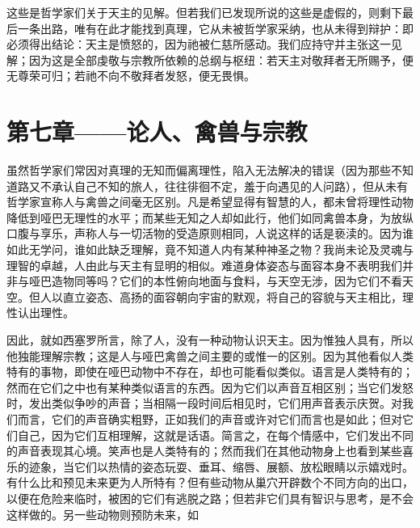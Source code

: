 这些是哲学家们关于天主的见解。但若我们已发现所说的这些是虚假的，则剩下最后一条出路，唯有在此才能找到真理，它从未被哲学家采纳，也从未得到辩护：即必须得出结论：天主是愤怒的，因为祂被仁慈所感动。我们应持守并主张这一见解；因为这是全部虔敬与宗教所依赖的总纲与枢纽：若天主对敬拜者无所赐予，便无尊荣可归；若祂不向不敬拜者发怒，便无畏惧。\par


\section{第七章——论人、禽兽与宗教}

虽然哲学家们常因对真理的无知而偏离理性，陷入无法解决的错误（因为那些不知道路又不承认自己不知的旅人，往往徘徊不定，羞于向遇见的人问路），但从未有哲学家宣称人与禽兽之间毫无区别。凡是希望显得有智慧的人，都未曾将理性动物降低到哑巴无理性的水平；而某些无知之人却如此行，他们如同禽兽本身，为放纵口腹与享乐，声称人与一切活物的受造原则相同，人说这样的话是亵渎的。因为谁如此无学问，谁如此缺乏理解，竟不知道人内有某种神圣之物？我尚未论及灵魂与理智的卓越，人由此与天主有显明的相似。难道身体姿态与面容本身不表明我们并非与哑巴造物同等吗？它们的本性俯向地面与食料，与天空无涉，因为它们不看天空。但人以直立姿态、高扬的面容朝向宇宙的默观，将自己的容貌与天主相比，理性认出理性。\par

因此，就如西塞罗所言，除了人，没有一种动物认识天主。因为惟独人具有，所以他独能理解宗教；这是人与哑巴禽兽之间主要的或惟一的区别。因为其他看似人类特有的事物，即使在哑巴动物中不存在，却也可能看似类似。语言是人类特有的；然而在它们之中也有某种类似语言的东西。因为它们以声音互相区别；当它们发怒时，发出类似争吵的声音；当相隔一段时间后相见时，它们用声音表示庆贺。对我们而言，它们的声音确实粗野，正如我们的声音或许对它们而言也是如此；但对它们自己，因为它们互相理解，这就是话语。简言之，在每个情感中，它们发出不同的声音表现其心境。笑声也是人类特有的；然而我们在其他动物身上也看到某些喜乐的迹象，当它们以热情的姿态玩耍、垂耳、缩唇、展额、放松眼睛以示嬉戏时。有什么比和预见未来更为人所特有？但有些动物从巢穴开辟数个不同方向的出口，以便在危险来临时，被困的它们有逃脱之路；但若非它们具有智识与思考，是不会这样做的。另一些动物则预防未来，如\par

\par

